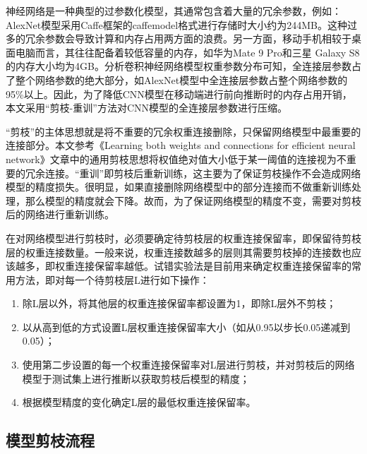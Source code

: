 神经网络是一种典型的过参数化模型，其通常包含着大量的冗余参数，例如：AlexNet模型采用Caffe框架的caffemodel格式进行存储时大小约为244MB。这种过多的冗余参数会导致计算和内存占用两方面的浪费。另一方面，移动手机相较于桌面电脑而言，其往往配备着较低容量的内存，如华为Mate 9 Pro和三星 Galaxy S8的内存大小均为4GB。分析卷积神经网络模型权重参数分布可知，全连接层参数占了整个网络参数的绝大部分，如AlexNet模型中全连接层参数占整个网络参数的95\%以上。因此，为了降低CNN模型在移动端进行前向推断时的内存占用开销，本文采用“剪枝-重训”方法对CNN模型的全连接层参数进行压缩。

“剪枝”的主体思想就是将不重要的冗余权重连接删除，只保留网络模型中最重要的连接部分。本文参考《Learning both weights and connections for efficient neural network》\cite{han2015learning}文章中的通用剪枝思想将权值绝对值大小低于某一阈值的连接视为不重要的冗余连接。“重训”即剪枝后重新训练，这主要为了保证剪枝操作不会造成网络模型的精度损失。很明显，如果直接删除网络模型中的部分连接而不做重新训练处理，那么模型的精度就会下降。故而，为了保证网络模型的精度不变，需要对剪枝后的网络进行重新训练。

在对网络模型进行剪枝时，必须要确定待剪枝层的权重连接保留率，即保留待剪枝层的权重连接数量。一般来说，权重连接数越多的层则其需要剪枝掉的连接数也应该越多，即权重连接保留率越低。试错实验法是目前用来确定权重连接保留率的常用方法，即对每一个待剪枝层L进行如下操作：
\begin{enumerate}
  \item 除L层以外，将其他层的权重连接保留率都设置为1，即除L层外不剪枝；
  \item 以从高到低的方式设置L层权重连接保留率大小（如从0.95以步长0.05递减到0.05）；
  \item 使用第二步设置的每一个权重连接保留率对L层进行剪枝，并对剪枝后的网络模型于测试集上进行推断以获取剪枝后模型的精度；
  \item 根据模型精度的变化确定L层的最低权重连接保留率。
\end{enumerate}


\subsection{模型剪枝流程}


